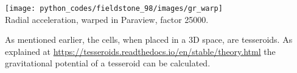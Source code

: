\begin{center}
\texttt{[image: python\_codes/fieldstone\_98/images/gr\_warp]}\\
{\captionfont Radial acceleration, warped in Paraview, factor 25000.}
\end{center}

As mentioned earlier, the cells, when placed in a 3D space, are tesseroids. 
As explained at \url{https://tesseroids.readthedocs.io/en/stable/theory.html}
the gravitational potential of a tesseroid can be calculated. \mscthesis 




